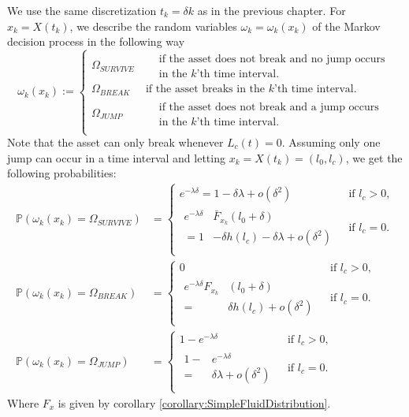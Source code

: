 We use the same discretization $t_k=\delta k$ as in the previous chapter.
For $x_k=X(t_k)$, we describe the random variables $\omega_k=\omega_k(x_k)$ of the Markov decision process in the following way
\[
\omega_k(x_k):=\begin{cases}
\Omega_{SURVIVE}&\ \begin{split}&\text{if the asset does not break and no jump occurs}\\
&\text{in the $k$'th time interval.}\end{split}\\
\Omega_{BREAK}&\ \text{if the asset breaks in the $k$'th time interval.}\\
\Omega_{JUMP}&\ \begin{split}&\text{if the asset does not break and a jump occurs}\\
&\text{in the $k$'th time interval.}\end{split}\\
\end{cases}
\]
Note that the asset can only break whenever $L_c(t)=0$.
Assuming only one jump can occur in a time interval and letting $x_k=X(t_k)=(l_0,l_c)$, we get the following probabilities:
\[
\begin{split}
\mathbb{P}(\omega_k(x_k)=\Omega_{SURVIVE})&=\begin{cases}
e^{-\lambda \delta}=1-\delta\lambda+o(\delta^2)&\text{ if }l_c>0,\\
\begin{split}
e^{-\lambda \delta} & \bar{F}_{x_k}(l_0+\delta)\\
=1&-\delta h(l_c)-\delta\lambda+o(\delta^2)
\end{split}&\text{ if }l_c=0.\\
\end{cases}\\
\mathbb{P}(\omega_k(x_k)=\Omega_{BREAK})&=\begin{cases}
0&\text{ if }l_c>0,\\
\begin{split}
e^{-\lambda \delta}F_{x_k}&(l_0+\delta)\\
=&\delta h(l_c)+o(\delta^2)
\end{split}&\text{ if }l_c=0.\\
\end{cases}\\
\mathbb{P}(\omega_k(x_k)=\Omega_{JUMP})&=\begin{cases}
1-e^{-\lambda \delta} & \text{ if }l_c>0,\\
\begin{split}
1-&e^{-\lambda \delta}\\
=&\delta\lambda+o(\delta^2)
\end{split}&\text{ if }l_c=0.\\
\end{cases}
\end{split}
\]
Where $F_x$ is given by corollary \ref{corollary:SimpleFluidDistribution}.

